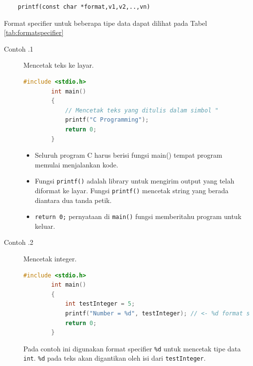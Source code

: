 \begin{verbatim}
	printf(const char *format,v1,v2,..,vn)
\end{verbatim}

Format specifier untuk beberapa tipe data dapat dilihat pada Tabel \ref{tab:formatspecifier}


\begin{description}
	\item[Contoh \thesubsection.1]  Mencetak teks ke layar.
		\begin{lstlisting}[language=c,caption = Mencetak Tulisan "C Programming" Ke layar,captionpos=t]
		#include <stdio.h>
		int main()
		{ 
			// Mencetak teks yang ditulis dalam simbol "
			printf("C Programming");
			return 0;
		}
		\end{lstlisting}

		\begin{itemize}
			\item Seluruh program C harus berisi fungsi main() tempat program memulai menjalankan kode.
			\item Fungsi \verb*|printf()| adalah library untuk mengirim output yang telah diformat ke layar.  Fungsi \verb*|printf()|  mencetak string yang berada diantara dua tanda petik.
			\item \verb*|return 0;| pernyataan di \verb*|main()| fungsi memberitahu program untuk keluar.
		\end{itemize}
	\item [Contoh \thesubsection.2] Mencetak integer.
		\begin{lstlisting}[language=c,captionpos=t]
		#include <stdio.h>
		int main()
		{
			int testInteger = 5;
			printf("Number = %d", testInteger); // <- %d format string
			return 0;
		}
	\end{lstlisting}

	    Pada contoh ini digunakan format specifier \verb*|%d| untuk mencetak tipe data \verb*|int|. \verb*|%d| pada teks akan digantikan oleh isi dari \verb*|testInteger|.


\end{description}
